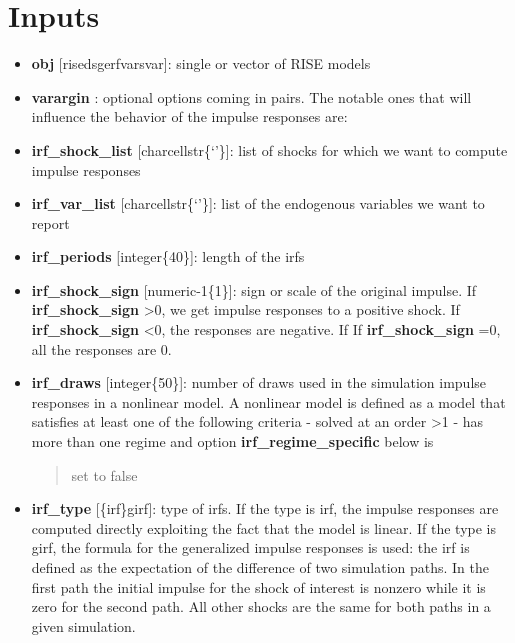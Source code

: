\documentclass[letterpaper,10pt,english]{sphinxmanual}
\begin{document}
\section{Inputs}
\label{classes/models/@rfvar/rfvar:id36}\begin{itemize}
\item {} 
\textbf{obj} {[}rise\textbar{}dsge\textbar{}rfvar\textbar{}svar{]}: single or vector of RISE models

\item {} 
\textbf{varargin} : optional options coming in pairs. The notable ones that
will influence the behavior of the impulse responses are:

\item {} 
\textbf{irf\_shock\_list} {[}char\textbar{}cellstr\textbar{}\{`'\}{]}: list of shocks for which we
want to compute impulse responses

\item {} 
\textbf{irf\_var\_list} {[}char\textbar{}cellstr\textbar{}\{`'\}{]}: list of the endogenous variables
we want to report

\item {} 
\textbf{irf\_periods} {[}integer\textbar{}\{40\}{]}: length of the irfs

\item {} 
\textbf{irf\_shock\_sign} {[}numeric\textbar{}-1\textbar{}\{1\}{]}: sign or scale of the original
impulse. If \textbf{irf\_shock\_sign} \textgreater{}0, we get impulse responses to a
positive shock. If \textbf{irf\_shock\_sign} \textless{}0, the responses are negative.
If If \textbf{irf\_shock\_sign} =0, all the responses are 0.

\item {} 
\textbf{irf\_draws} {[}integer\textbar{}\{50\}{]}: number of draws used in the simulation
impulse responses in a nonlinear model. A nonlinear model is defined as
a model that satisfies at least one of the following criteria
- solved at an order \textgreater{}1
- has more than one regime and option \textbf{irf\_regime\_specific} below is
\begin{quote}

set to false
\end{quote}

\item {} 
\textbf{irf\_type} {[}\{irf\}\textbar{}girf{]}: type of irfs. If the type is irf, the
impulse responses are computed directly exploiting the fact that the
model is linear. If the type is girf, the formula for the generalized
impulse responses is used: the irf is defined as the expectation of the
difference of two simulation paths. In the first path the initial
impulse for the shock of interest is nonzero while it is zero for the
second path. All other shocks are the same for both paths in a given
simulation.


\end{itemize}
\end{document}
